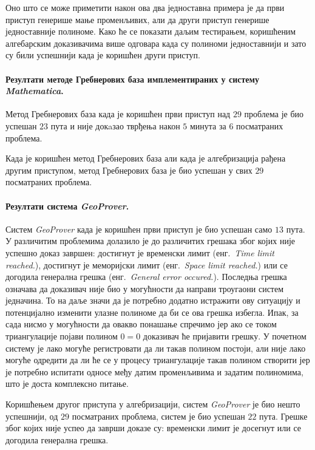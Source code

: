 Оно што се може приметити након ова два једноставна примера је да први
приступ генерише мање променљивих, али да други приступ генерише
једноставније полиноме. Како ће се показати даљим тестирањем,
коришћеним алгебарским доказивачима више одговара када су полиноми
једноставнији и зато су били успешнији када је коришћен други приступ.


\paragraph{Резултати методе Гребнерових база имплементираних у систему \emph{Mathematica}.}
Метод Гребнерових база када је коришћен први приступ над $29$ проблема
је био успешан $23$ пута и није докaзао тврђења након $5$ минута за $6$
посматраних проблема.

Када је коришћен метод Гребнерових база али када је алгебризација
рађена другим приступом, метод Гребнерових база је био успешан у свих
$29$ посматраних проблема.


\paragraph{Резултати система \emph{GeoProver}.}
Систем \emph{GeoProver} када је коришћен први приступ је био успешан
само $13$ пута. У различитим проблемима долазило је до различитих
грешака због којих није успешно доказ завршен: достигнут је временски
лимит (енг.~\emph{Time limit reached.}), достигнут је меморијски лимит
(енг.~\emph{Space limit reached.}) или се догодила генерална грешка
(енг.~\emph{General error occured.}). Последња грешка означава да
доказивач није био у могућности да направи троугаони систем
једначина. То на даље значи да је потребно додатно истражити ову
ситуацију и потенцијално изменити улазне полиноме да би се ова грешка
избегла. Ипак, за сада нисмо у могућности да овакво понашање спречимо
јер ако се током триангулације појави полином $0=0$ доказивач ће
пријавити грешку. У почетном систему је лако могуће регистровати да ли
такав полином постоји, али није лако могуће одредити да ли ће се у
процесу триангулације такав полином створити јер је потребно испитати
односе међу датим променљивима и задатим полиномима, што је доста
комплексно питање.

Коришћењем другог приступа у алгебризацији, систем \emph{GeoProver} је
био нешто успешнији, од $29$ посматраних проблема, систем је био
успешан $22$ пута. Грешке због којих није успео да заврши доказе су:
временски лимит је досегнут или се догодила генерална грешка.

